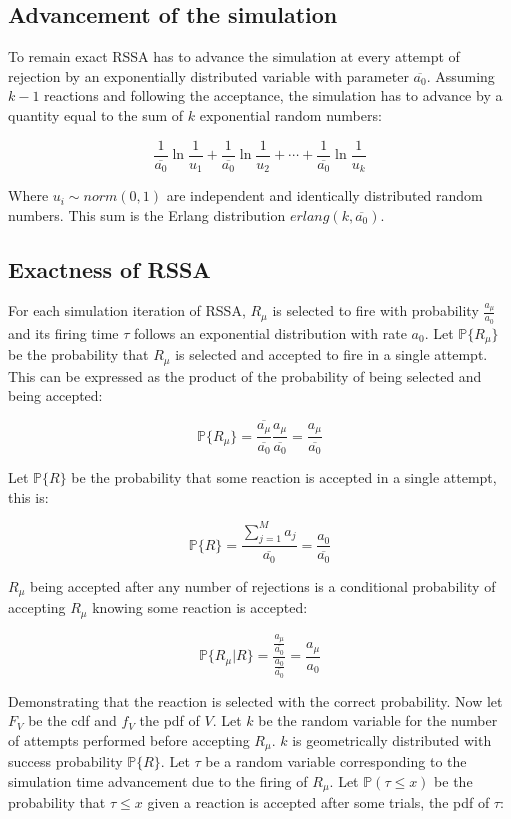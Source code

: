   \subsection{Advancement of the simulation}
  To remain exact RSSA has to advance the simulation at every attempt of rejection by an exponentially distributed variable with parameter $\overline{a_0}$.
  Assuming $k-1$ reactions and following the acceptance, the simulation has to advance by a quantity equal to the sum of $k$ exponential random numbers:

  $$\frac{1}{\overline{a_0}}\ln\frac{1}{u_1}+\frac{1}{\overline{a_0}}\ln\frac{1}{u_2}+\cdots+\frac{1}{\overline{a_0}}\ln\frac{1}{u_k}$$

  Where $u_i\sim norm(0,1)$ are independent and identically distributed random numbers.
  This sum is the Erlang distribution $erlang(k, \overline{a_0})$.

  \subsection{Exactness of RSSA}
  For each simulation iteration of RSSA, $R_\mu$ is selected to fire with probability $\frac{a_\mu}{a_0}$ and its firing time $\tau$ follows an exponential distribution with rate $a_0$.
  Let $\mathbb{P}\{R_\mu\}$ be the probability that $R_\mu$ is selected and accepted to fire in a single attempt.
  This can be expressed as the product of the probability of being selected and being accepted:

  $$\mathbb{P}\{R_\mu\} = \frac{\overline{a_\mu}}{\overline{a_0}}\frac{a_\mu}{\overline{a_0}} = \frac{a_\mu}{\overline{a_0}}$$

  Let $\mathbb{P}\{R\}$ be the probability that some reaction is accepted in a single attempt, this is:

  $$\mathbb{P}\{R\} = \frac{\sum\limits_{j=1}^Ma_j}{\overline{a_0}} = \frac{a_0}{\overline{a_0}}$$

  $R_\mu$ being accepted after any number of rejections is a conditional probability of accepting $R_\mu$ knowing some reaction is accepted:

  $$\mathbb{P}\{R_\mu|R\} = \frac{\frac{a_\mu}{\overline{a_0}}}{\frac{a_0}{\overline{a_0}}} = \frac{a_\mu}{a_0}$$

  Demonstrating that the reaction is selected with the correct probability.
  Now let $F_V$ be the cdf and $f_V$ the pdf of $V$.
  Let $k$ be the random variable for the number of attempts performed before accepting $R_\mu$.
  $k$ is geometrically distributed with success probability $\mathbb{P}\{R\}$.
  Let $\tau$ be a random variable corresponding to the simulation time advancement due to the firing of $R_\mu$.
  Let $\mathbb{P}(\tau\le x)$ be the probability that $\tau\le x$ given a reaction is accepted after some trials, the pdf of $\tau$:

